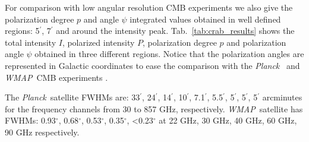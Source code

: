 \documentclass[twocolumn,traditabstract]{aa}
\def\Planck{\textit{Planck}}
\def\WMAP{\textit{WMAP}}
\begin{document}
For comparison with low angular resolution CMB experiments we also give the
polarization degree $p$ and angle $\psi$ integrated values obtained in well
defined regions: 5$^\prime$, 7$^\prime$ and around the intensity peak.
Tab.~\ref{tab:crab_results} shows the total intensity $I$, polarized intensity
$P$, polarization degree $p$ and polarization angle $\psi$ obtained in three
different regions.
Notice that the polarization angles are represented in Galactic coordinates to ease the comparison with the \Planck\ \citep{2015arXiv150702058P} and \WMAP\ CMB experiments \citep{2011ApJS..192...19W}. 

The \Planck\ satellite FWHMs are: 33$^{\prime}$, 24$^{\prime}$, 14$^{\prime}$, 10$^{\prime}$, 7.1$^{\prime}$, 5.5$^{\prime}$, 5$^{\prime}$, 5$^{\prime}$, 5$^{\prime}$ arcminutes for the frequency channels from 30 to 857 GHz, respectively.
\WMAP\ satellite has FWHMs: 0.93$^{\circ}$, 0.68$^{\circ}$, 0.53$^{\circ}$, 0.35$^{\circ}$, \textless 0.23$^{\circ}$ at 22 GHz, 30 GHz, 40 GHz, 60 GHz, 90 GHz respectively. 
\end{document}
